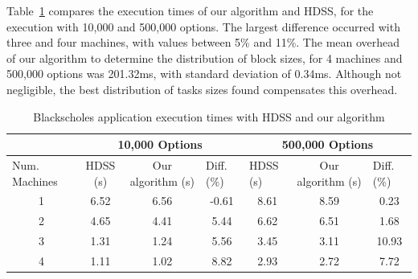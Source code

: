 \documentclass[journal]{IEEEtran}
\begin{document}
Table~\ref{table: black} compares the execution times of our algorithm and HDSS,
for the execution with 10,000 and 500,000 options. The largest difference
occurred with three and four machines, with values between 5\% and 11\%. The
mean overhead of our algorithm to determine the distribution of block sizes, for
4 machines and 500,000 options was 201.32ms, with standard deviation of 0.34ms.
Although not negligible, the best distribution of tasks sizes found compensates
this overhead.








\begin{table}[htb]
\centering
\caption{Blackscholes application execution times with HDSS and our algorithm}
\begin{scriptsize}
\begin{tabular}{c|c|c|c|c|c|c|}
\cline{2-7}
\multicolumn{1}{l|}{}                 & \multicolumn{3}{c|}{10,000 Options}                              & \multicolumn{3}{c|}{500,000 Options}                                                  \\ \hline
\multicolumn{1}{|l|}{Num. Machines} & HDSS (s) & Our algorithm (s) & \multicolumn{1}{l|}{Diff. (\%)} & \multicolumn{1}{l|}{HDSS (s)} & Our algorithm (s) & \multicolumn{1}{l|}{Diff. (\%)} \\ \hline
\multicolumn{1}{|c|}{1 }       & 6.52     & 6.56              &    -0.61                       
			 & 8.61                          & 8.59              &   0.23                         \\ \hline
\multicolumn{1}{|c|}{2 }      & 4.65     & 4.41              &    5.44                         
				& 6.62                          & 6.51              & 1.68                            \\ \hline
\multicolumn{1}{|c|}{3 }      & 1.31     & 1.24              & 5.56                            
			& 3.45                          & 3.11              &         10.93                    \\ \hline
\multicolumn{1}{|c|}{4 }      & 1.11     & 1.02              & 8.82                       
			    & 2.93                          & 2.72              &         7.72                  \\ \hline
\end{tabular}
\end{scriptsize}
\label{table: black}
\end{table}
\end{document}
